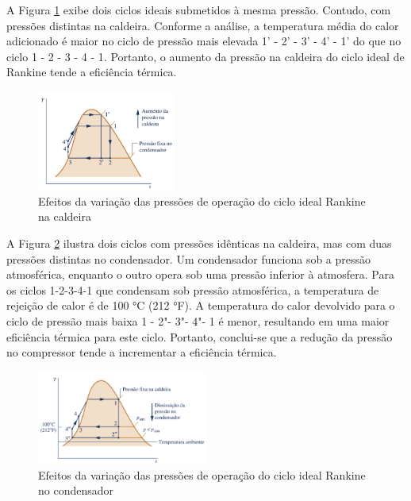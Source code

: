 \documentclass[
	article,			%
	11pt,				%
	oneside,			%
	a4paper,			%
	english,			%
	brazil,				%
	sumario=tradicional
	]{abntex2}
\begin{document}
A Figura \ref{fig:efeitos-caldeira} exibe dois ciclos ideais submetidos à mesma pressão. Contudo, com pressões distintas na caldeira. Conforme a análise, a temperatura média do calor adicionado é maior no ciclo de pressão mais elevada 1' - 2' - 3' - 4' - 1' do que no ciclo 1 - 2 - 3 - 4 - 1. Portanto, o aumento da pressão na caldeira do ciclo ideal de Rankine tende a eficiência térmica.

\begin{figure}[h]
	\centering
	\includegraphics[width=0.4\textwidth]{./images/efeitos-caldeira.png}
	\caption{Efeitos da variação das pressões de operação do ciclo ideal Rankine na caldeira}
	\label{fig:efeitos-caldeira}
\end{figure}

A Figura \ref{fig:efeito-condensador} ilustra dois ciclos com pressões idênticas na caldeira, mas com duas pressões distintas no condensador. Um condensador funciona sob a pressão atmosférica, enquanto o outro opera sob uma pressão inferior à atmosfera. Para os ciclos 1-2-3-4-1 que condensam sob pressão atmosférica, a temperatura de rejeição de calor é de 100 °C (212 °F). A temperatura do calor devolvido para o ciclo de pressão mais baixa 1 - 2"- 3"- 4"- 1 é menor, resultando em uma maior eficiência térmica para este ciclo. Portanto, conclui-se que a redução da pressão no compressor tende a incrementar a eficiência térmica.

\begin{figure}[h]
	\centering
	\includegraphics[width=0.5\textwidth]{./images/efeito-condensador.png}
	\caption{Efeitos da variação das pressões de operação do ciclo ideal Rankine no condensador}
	\label{fig:efeito-condensador}
\end{figure}
\end{document}
